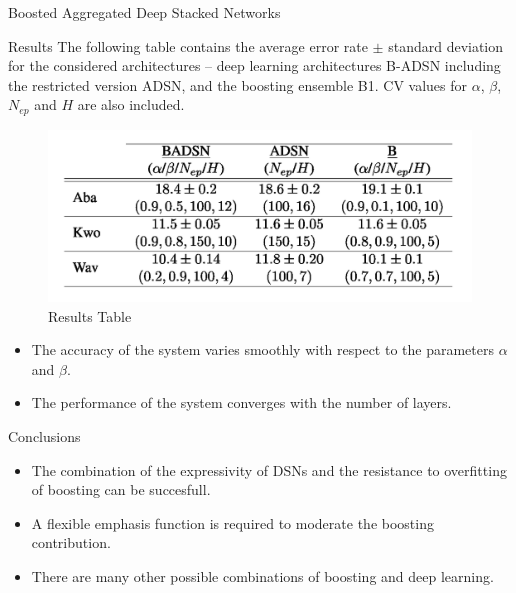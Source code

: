 \documentclass[final,hyperref={pdfpagelabels=false}]{beamer}
\begin{document}
\begin{frame}[t]
\begin{columns}[t]
\begin{column}{.465\textwidth}
\begin{block}{	Boosted Aggregated Deep Stacked Networks}
\begin{itemize}
\end{itemize}

\end{block}

\begin{block}{Results}
The following table contains  the average error rate $\pm$ standard deviation for the considered architectures -- deep learning architectures B-ADSN including the restricted version ADSN, and the boosting ensemble B1. CV values for $\alpha$, $\beta$, $N_{ep}$ and $H$ are also included.
\begin{figure}
\includegraphics[width=0.8\linewidth]{table1.png}
\caption{Results Table}
\end{figure}
\begin{itemize}
\setlength{\itemindent}{1em}
\item The accuracy of the system varies smoothly with respect to the parameters $\alpha$ and $\beta$.
\item The performance of the system converges with the number of layers.

\end{itemize}
\end{block}




\begin{block}{Conclusions}

\begin{itemize}
\setlength{\itemindent}{0.5em}
\item The combination of the expressivity of DSNs and the resistance to overfitting of boosting can be succesfull.

\item A flexible emphasis function is required to moderate the boosting contribution.

\item There are many other possible combinations of boosting and deep learning.
\end{itemize}


\end{block}
\end{column}
\end{columns}
\end{frame}
\end{document}
